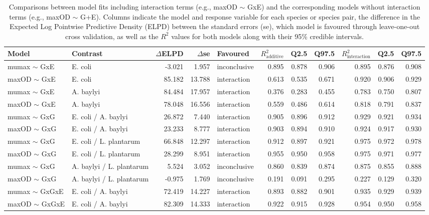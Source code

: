\begin{table}[ht]
\centering
\begingroup\footnotesize
\begin{tabular}{llrrlrrrrrr}
  \hline
Model & Contrast & $\Delta$ELPD & $\Delta$se & Favoured & $R^2_{\text{additive}}$ & Q2.5 & Q97.5 & $R^2_{\text{interaction}}$ & Q2.5 & Q97.5 \\ 
  \hline
mumax $\sim$ GxE & E. coli & -3.021 & 1.957 & inconclusive & 0.895 & 0.878 & 0.906 & 0.895 & 0.876 & 0.908 \\ 
  maxOD $\sim$ GxE & E. coli & 85.182 & 13.788 & interaction & 0.613 & 0.535 & 0.671 & 0.920 & 0.906 & 0.929 \\ 
  mumax $\sim$ GxE & A. baylyi & 84.484 & 17.957 & interaction & 0.376 & 0.283 & 0.455 & 0.783 & 0.750 & 0.807 \\ 
  maxOD $\sim$ GxE & A. baylyi & 78.048 & 16.556 & interaction & 0.559 & 0.486 & 0.614 & 0.818 & 0.791 & 0.837 \\ 
  mumax $\sim$ GxG & E. coli / A. baylyi & 26.872 & 7.440 & interaction & 0.905 & 0.896 & 0.912 & 0.929 & 0.921 & 0.934 \\ 
  maxOD $\sim$ GxG & E. coli / A. baylyi & 23.233 & 8.777 & interaction & 0.903 & 0.894 & 0.910 & 0.924 & 0.917 & 0.930 \\ 
  mumax $\sim$ GxG & E. coli / L. plantarum & 66.848 & 12.297 & interaction & 0.912 & 0.897 & 0.921 & 0.975 & 0.972 & 0.978 \\ 
  maxOD $\sim$ GxG & E. coli / L. plantarum & 28.299 & 8.951 & interaction & 0.955 & 0.950 & 0.958 & 0.975 & 0.971 & 0.977 \\ 
  mumax $\sim$ GxG & A. baylyi / L. plantarum & 5.524 & 3.052 & inconclusive & 0.860 & 0.839 & 0.874 & 0.875 & 0.855 & 0.888 \\ 
  maxOD $\sim$ GxG & A. baylyi / L. plantarum & -0.975 & 1.769 & inconclusive & 0.191 & 0.091 & 0.295 & 0.227 & 0.129 & 0.320 \\ 
  mumax $\sim$ GxGxE & E. coli / A. baylyi & 72.419 & 14.227 & interaction & 0.893 & 0.882 & 0.901 & 0.935 & 0.929 & 0.939 \\ 
  maxOD $\sim$ GxGxE & E. coli / A. baylyi & 82.309 & 14.333 & interaction & 0.922 & 0.915 & 0.928 & 0.954 & 0.950 & 0.958 \\ 
   \hline
\end{tabular}
\endgroup
\caption{Comparisons between model fits including interaction terms (e.g., maxOD $\sim$ GxE) and the corresponding models without interaction terms (e.g., maxOD $\sim$ G+E). Columns indicate the model and response variable for each species or species pair, the difference in the Expected Log Pointwise Predictive Density (ELPD) between the standard errors (se), which model is favoured through leave-one-out cross validation, as well as the $R^2$ values for both models along with their 95\% credible intervals.} 
\label{supptab:model_comparisons}
\end{table}
